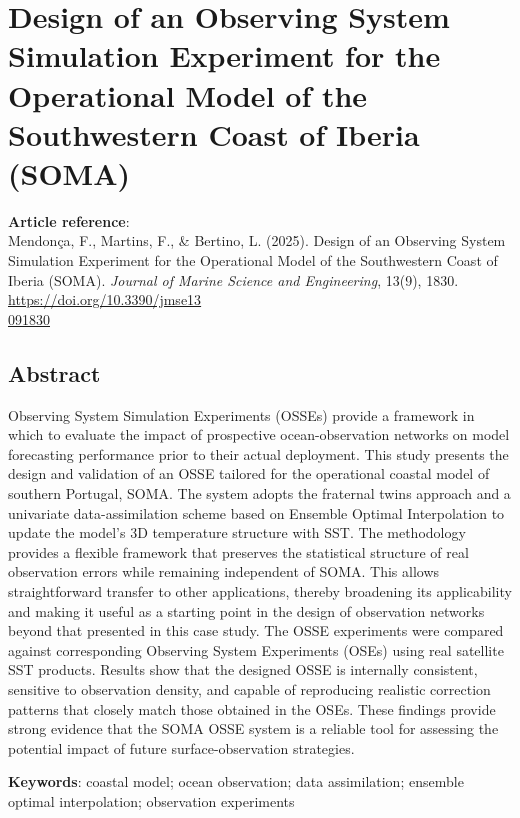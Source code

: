 \chapter{Design of an Observing System Simulation Experiment for the Operational Model of the Southwestern Coast of Iberia (SOMA)} \label{sec:cp2}
\vspace{\fill}
\textbf{Article reference}:\\
Mendonça, F., Martins, F., \& Bertino, L. (2025). Design of an Observing System Simulation Experiment for the Operational Model of the Southwestern Coast of Iberia (SOMA). \textit{Journal of Marine Science and Engineering}, 13(9), 1830. \href{https://doi.org/10.3390/jmse13091830}{https://doi.org/10.3390/jmse13\\091830}
\newpage

\section{Abstract}
Observing System Simulation Experiments (OSSEs) provide a framework in which to evaluate the impact of prospective ocean-observation networks on model forecasting performance prior to their actual deployment. This study presents the design and validation of an OSSE tailored for the operational coastal model of southern Portugal, SOMA. The system adopts the fraternal twins approach and a univariate data-assimilation scheme based on Ensemble Optimal Interpolation to update the model's 3D temperature structure with SST. The methodology provides a flexible framework that preserves the statistical structure of real observation errors while remaining independent of SOMA. This allows straightforward transfer to other applications, thereby broadening its applicability and making it useful as a starting point in the design of observation networks beyond that presented in this case study. The OSSE experiments were compared against corresponding Observing System Experiments (OSEs) using real satellite SST products. Results show that the designed OSSE is internally consistent, sensitive to observation density, and capable of reproducing realistic correction patterns that closely match those obtained in the OSEs. These findings provide strong evidence that the SOMA OSSE system is a reliable tool for assessing the potential impact of future surface-observation strategies.

\vspace{15mm}
\noindent\textbf{Keywords}: coastal model; ocean observation; data assimilation; ensemble optimal interpolation; observation experiments
\vspace{10mm}

